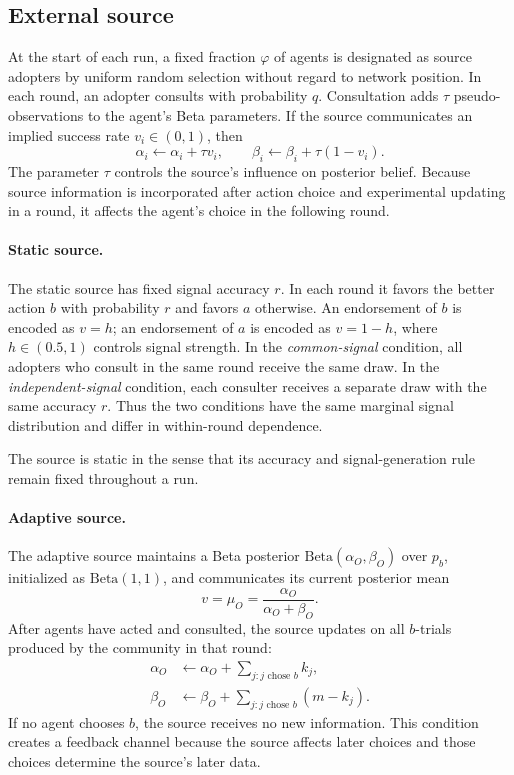 \documentclass[10pt,letterpaper,twocolumn]{article}
\begin{document}
\subsection{External source}
\label{sec:source}

At the start of each run, a fixed fraction $\varphi$ of agents is designated as source adopters by uniform random selection without regard to network position. In each round, an adopter consults with probability $q$. Consultation adds $\tau$ pseudo-observations to the agent's Beta parameters. If the source communicates an implied success rate $v_i\in(0,1)$, then
\begin{equation}
  \alpha_i\leftarrow\alpha_i+\tau v_i, \qquad
  \beta_i\leftarrow\beta_i+\tau(1-v_i).
  \label{eq:source}
\end{equation}
The parameter $\tau$ controls the source's influence on posterior belief. Because source information is incorporated after action choice and experimental updating in a round, it affects the agent's choice in the following round.

\paragraph{Static source.}
The static source has fixed signal accuracy $r$. In each round it favors the better action $b$ with probability $r$ and favors $a$ otherwise. An endorsement of $b$ is encoded as $v=h$; an endorsement of $a$ is encoded as $v=1-h$, where $h\in(0.5,1)$ controls signal strength. In the \emph{common-signal} condition, all adopters who consult in the same round receive the same draw. In the \emph{independent-signal} condition, each consulter receives a separate draw with the same accuracy $r$. Thus the two conditions have the same marginal signal distribution and differ in within-round dependence.

The source is static in the sense that its accuracy and signal-generation rule remain fixed throughout a run.

\paragraph{Adaptive source.}
The adaptive source maintains a Beta posterior $\mathrm{Beta}(\alpha_O,\beta_O)$ over $p_b$, initialized as $\mathrm{Beta}(1,1)$, and communicates its current posterior mean
\begin{equation}
  v=\mu_O=\frac{\alpha_O}{\alpha_O+\beta_O}.
\end{equation}
After agents have acted and consulted, the source updates on all $b$-trials produced by the community in that round:
\begin{align}
  \alpha_O&\leftarrow\alpha_O+
  \sum_{j:j\text{ chose }b}k_j,\\
  \beta_O&\leftarrow\beta_O+
  \sum_{j:j\text{ chose }b}(m-k_j).
\end{align}
If no agent chooses $b$, the source receives no new information. This condition creates a feedback channel because the source affects later choices and those choices determine the source's later data.
\end{document}
